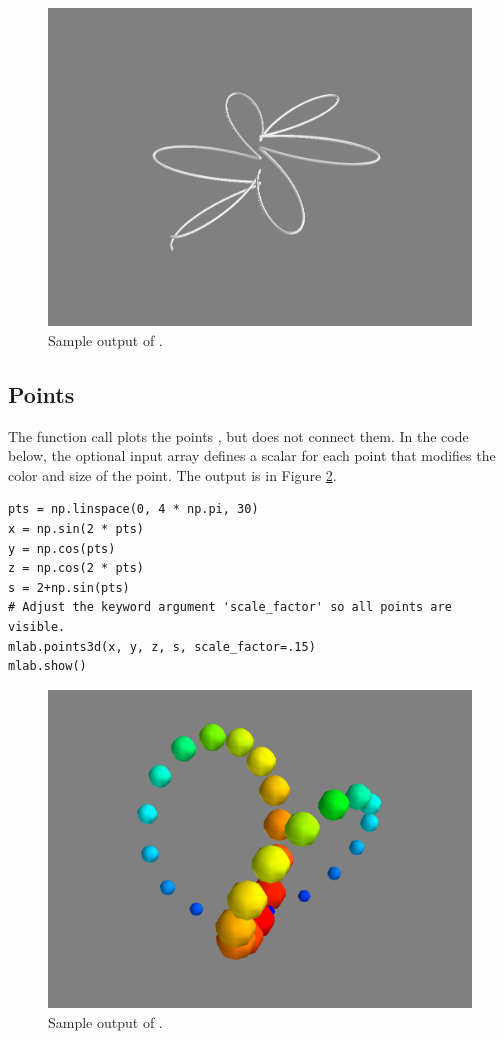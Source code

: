 \begin{figure}
\includegraphics[width=.7\textwidth]{plot3d.png}
\caption{Sample output of .}
\label{fig:plot3d}
\end{figure}


\subsection*{Points}
The function call  plots the points , but does not connect them.
In the code below, the optional input array  defines a scalar for each point that modifies the color and size of the point.
The output is in Figure \ref{fig:points3d}.

\begin{lstlisting}
pts = np.linspace(0, 4 * np.pi, 30)
x = np.sin(2 * pts)
y = np.cos(pts)
z = np.cos(2 * pts)
s = 2+np.sin(pts)
# Adjust the keyword argument 'scale_factor' so all points are visible.
mlab.points3d(x, y, z, s, scale_factor=.15)
mlab.show()
\end{lstlisting}

\begin{figure}
\includegraphics[width=.7\textwidth]{points3d.png}
\caption{Sample output of .}
\label{fig:points3d}
\end{figure}


